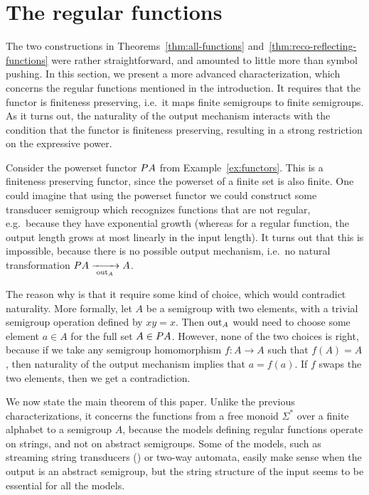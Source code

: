 

\section{The regular functions}
\label{sec:reg-char}
The two constructions in Theorems~\ref{thm:all-functions} and~\ref{thm:reco-reflecting-functions} were rather straightforward, and amounted to little more than symbol pushing. In this section, we present a more advanced  characterization, which concerns  the regular functions mentioned in the introduction.
It requires that the functor is finiteness preserving, i.e.~it maps finite semigroups to finite semigroups. As it turns out, the naturality of the output mechanism interacts with the condition that 
the functor is finiteness preserving, resulting in a strong restriction on the expressive power.

\begin{example}
    Consider the powerset functor $\powerset A$ from Example~\ref{ex:functors}. This is a finiteness preserving functor, since the powerset of a finite set is also finite. One could imagine that using the powerset functor we could construct some transducer semigroup which recognizes functions that are not regular, e.g.~because they have exponential growth (whereas for a regular function, the output length grows at most linearly in the input length). It turns out that this is impossible, because there is no possible output mechanism, i.e.~no natural transformation $\powerset A \xrightarrow[\;\outfun_A\;]{} A$.

    The reason why is that it require some kind of choice, which would contradict naturality. More formally, let $A$ be a semigroup with two elements, with a trivial semigroup operation defined by $xy=x$. Then $\mathrm{out}_A$ would need to choose some element $a \in A$ for the full set $A \in \powerset A$. However, none of the two choices is right, because if we take any semigroup homomorphism $f : A \to A$ such that $f(A)=A$, then  naturality of the output mechanism implies that $a=f(a)$. If $f$ swaps the two elements, then we get a contradiction.
\end{example}

We now state the main theorem of this paper. Unlike the previous characterizations, it concerns the functions from a free monoid $\Sigma^*$ over a finite alphabet to a semigroup $A$, because the models defining regular functions operate on strings, and not on abstract semigroups. Some of the models, such as streaming string transducers (\sst) or two-way automata, easily make sense when the output is an abstract semigroup, but the string structure of the input seems to be essential for all the models. 

